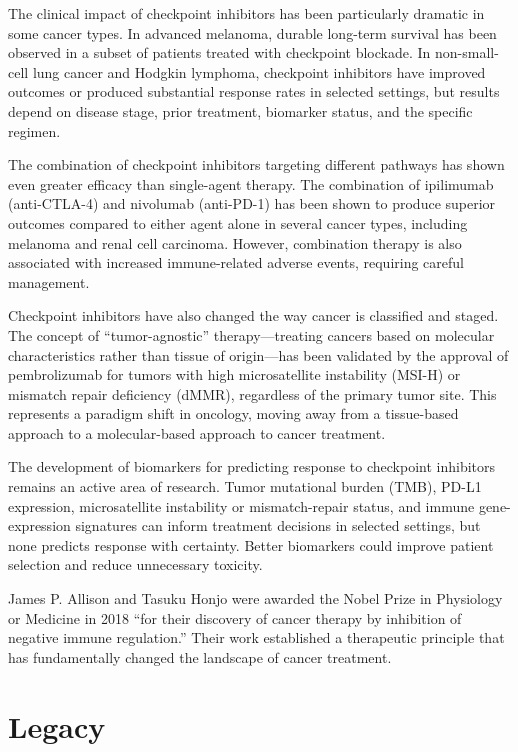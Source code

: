 The clinical impact of checkpoint inhibitors has been particularly dramatic in some cancer types. In advanced melanoma, durable long-term survival has been observed in a subset of patients treated with checkpoint blockade. In non-small-cell lung cancer and Hodgkin lymphoma, checkpoint inhibitors have improved outcomes or produced substantial response rates in selected settings, but results depend on disease stage, prior treatment, biomarker status, and the specific regimen.

The combination of checkpoint inhibitors targeting different pathways has shown even greater efficacy than single-agent therapy. The combination of ipilimumab (anti-CTLA-4) and nivolumab (anti-PD-1) has been shown to produce superior outcomes compared to either agent alone in several cancer types, including melanoma and renal cell carcinoma. However, combination therapy is also associated with increased immune-related adverse events, requiring careful management.

Checkpoint inhibitors have also changed the way cancer is classified and staged. The concept of ``tumor-agnostic'' therapy---treating cancers based on molecular characteristics rather than tissue of origin---has been validated by the approval of pembrolizumab for tumors with high microsatellite instability (MSI-H) or mismatch repair deficiency (dMMR), regardless of the primary tumor site. This represents a paradigm shift in oncology, moving away from a tissue-based approach to a molecular-based approach to cancer treatment.

The development of biomarkers for predicting response to checkpoint inhibitors remains an active area of research. Tumor mutational burden (TMB), PD-L1 expression, microsatellite instability or mismatch-repair status, and immune gene-expression signatures can inform treatment decisions in selected settings, but none predicts response with certainty. Better biomarkers could improve patient selection and reduce unnecessary toxicity.

James P. Allison and Tasuku Honjo were awarded the Nobel Prize in Physiology or Medicine in 2018 ``for their discovery of cancer therapy by inhibition of negative immune regulation.'' Their work established a therapeutic principle that has fundamentally changed the landscape of cancer treatment.

\section{Legacy}

